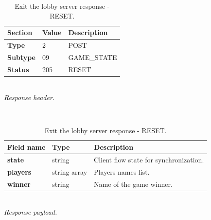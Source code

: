 \documentclass[english, sem, kiv, he, iso690alph, pdf, viewonly]{fasthesis}
\begin{document}
\begin{table}[h!]
	\centering
	\begin{minipage}[b]{1.0\textwidth}
		\centering
		\begin{tabular}{|l|l|l|}
			\hline
			\textbf{Section} & \textbf{Value} & \textbf{Description} \\ \hline
			\textbf{Type} & 2 & \footnotesize{POST} \\ \hline
			\textbf{Subtype} & 09 & \footnotesize{GAME\_STATE}  \\ \hline
			\textbf{Status} & 205 & \footnotesize{RESET} \\ \hline
		\end{tabular} \\
		\textit{Response header.}
	\end{minipage} 
	\\
	\vspace{10pt}
	\begin{minipage}[b]{1.0\textwidth}
		\centering
		\begin{tabular}{|l|l|l|}
			\hline
			\textbf{Field name} & \textbf{Type} & \textbf{Description} \\ \hline
			\textbf{state} & string & Client flow state for synchronization. \\ \hline
            \textbf{players} & string array & Players names list. \\ \hline
            \textbf{winner} & string & Name of the game winner. \\ \hline
		\end{tabular} \\
		\textit{Response payload.}
	\end{minipage}	
	\caption{Exit the lobby server response - RESET.}
	\label{tab:get_game_state_response_reset}
\end{table}
\end{document}
